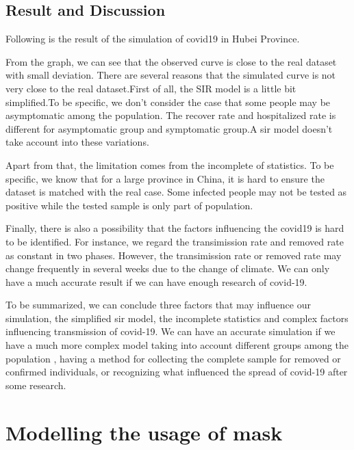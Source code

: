 \documentclass{article}
\begin{document}
\subsection{Result and Discussion}
Following is the result of the simulation of covid19 in Hubei Province.

From the graph, we can see that the observed curve is close to the real dataset with small deviation.
There are several reasons that the simulated curve is not very close to the real dataset.First of all, the SIR model is a little bit simplified.To be specific, we don't consider the case that some people may be asymptomatic among the population. The recover rate and hospitalized rate is different for asymptomatic group and symptomatic group.A sir model doesn't take account into these variations.

Apart from that, the limitation comes from the incomplete of statistics. To be specific, we know that for a large province in China, it is hard to ensure the dataset is matched with the real case. Some infected people may not be tested as positive while the tested sample is only part of population.

Finally, there is also a possibility that the factors influencing the covid19 is hard to be identified. For instance, we regard the transimission rate and removed rate as constant in two phases. However, the transimission rate or removed rate may change frequently in several weeks due to the change of climate. We can only have a much accurate result if we can have enough research of covid-19.

To be summarized, we can conclude three factors that may influence our simulation, the simplified sir model, the incomplete statistics and complex factors influencing transmission of covid-19. We can have an accurate simulation if we have a much more complex model taking into account different groups among the population , having a method for collecting the complete sample for removed or confirmed individuals, or recognizing what influenced the spread of covid-19 after some research.


\section{Modelling the usage of mask}
\end{document}
